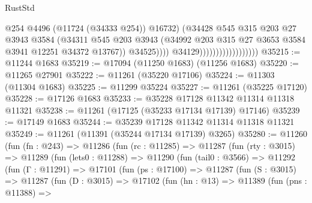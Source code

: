 \begin{lexlean}{RustStd}
\begin{coremodule}
                                                @254
                                                @4496
                                                (@11724 (@34333 @254))
                                                @16732)
                                              (@34428
                                                @545
                                                @315
                                                @203
                                                @27
                                                @3943
                                                @3584
                                                (@34311
                                                  @545
                                                  @203
                                                  @3943
                                                  (@34992
                                                    @203
                                                    @315
                                                    @27
                                                    @3653
                                                    @3584
                                                    @3941
                                                    @12251
                                                    @34372
                                                    @13767))
                                                @34525))))
                                        @34129))))))))))))))))))
@35215 := @11244 @1683
@35219 := @17094 (@11250 @1683) (@11256 @1683)
@35220 := @11265 @27901
@35222 := @11261 (@35220 @17106)
@35224 := @11303 (@11304 @1683)
@35225 := @11299 @35224
@35227 := @11261 (@35225 @17120)
@35228 := @17126 @1683
@35233 := @35228 @17128 @11342 @11314 @11318 @11321
@35238 := @11261 (@17125 (@35233 @17134 @17139) @17146)
@35239 := @17149 @1683
@35244 := @35239 @17128 @11342 @11314 @11318 @11321
@35249 := @11261 (@11391 (@35244 @17134 @17139) @3265)
@35280 := @11260
    (fun (fn : @243) =>
    @11286
      (fun (rc : @11285) =>
      @11287
        (fun (rty : @3015) =>
        @11289
          (fun (lets0 : @11288) =>
          @11290
            (fun (tail0 : @3566) =>
            @11292
              (fun (Γ : @11291) =>
              @17101
                (fun (ps : @17100) =>
                @11287
                  (fun (S : @3015) =>
                  @11287
                    (fun (D : @3015) =>
                    @17102
                      (fun (hn : @13) =>
                      @11389
                        (fun (pns : @11388) =>

\end{coremodule}
\end{lexlean}
